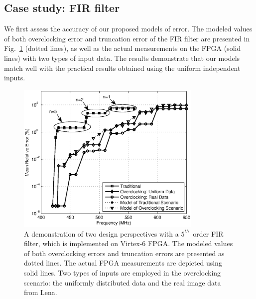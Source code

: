 \documentclass[journal]{IEEEtran}
\begin{document}
\subsection{Case study: FIR filter}
We first assess the accuracy of our proposed models of error. The modeled values of both overclocking error and truncation error of the FIR filter are presented in Fig.~\ref{FIR} (dotted lines), as well as the actual measurements on the FPGA (solid lines) with two types of input data. The results demonstrate that our models match well with the practical results obtained using the uniform independent inputs.
\begin{figure}[tbp]
  \centering
  \includegraphics[width=3.5in]{./Figures/Exp/FIR/FIR_Error_New_TCAD.eps}
  \caption{A demonstration of two design perspectives with a $5^{th}$~order FIR filter, which is implemented on Virtex-6 FPGA. The modeled values of both overclocking errors and truncation errors are presented as dotted lines. The actual FPGA measurements are depicted using solid lines. Two types of inputs are employed in the overclocking scenario: the uniformly distributed data and the real image data from Lena.}
  \label{FIR}
\end{figure}
\end{document}
